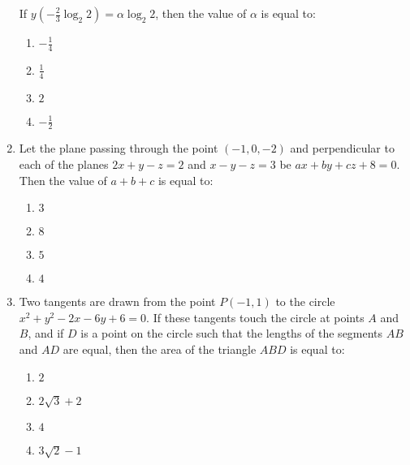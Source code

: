 \documentclass[journal]{IEEEtran}
\numberwithin{equation}{enumi}
\numberwithin{figure}{enumi}
\begin{document}
\begin{enumerate}
    If $ y\left(-\frac{2}{3} \log_2 2\right) = \alpha \log_2 2$, then the value of $ \alpha $ is equal to:
    \begin{enumerate}
        \item $ -\frac{1}{4} $
        \item $ \frac{1}{4} $
        \item $ 2 $
        \item $ -\frac{1}{2} $
    \end{enumerate}
    \item Let the plane passing through the point $(-1, 0, -2)$ and perpendicular to each of the planes $2x + y - z = 2$ and $x - y - z = 3$ be $ax + by + cz + 8 = 0$. Then the value of $ a + b + c $ is equal to:
    \begin{enumerate}
        \item $ 3 $
        \item $ 8 $
        \item $ 5 $
        \item $ 4 $
    \end{enumerate}

    \item Two tangents are drawn from the point $P(-1, 1)$ to the circle $x^2 + y^2 - 2x - 6y + 6 = 0$. If these tangents touch the circle at points $A$ and $B$, and if $D$ is a point on the circle such that the lengths of the segments $AB$ and $AD$ are equal, then the area of the triangle $ABD$ is equal to:
    \begin{enumerate}
        \item $ 2 $
        \item $ 2\sqrt{3} + 2 $
        \item $ 4 $
        \item $ 3\sqrt{2} - 1 $
    \end{enumerate}

  
\end{enumerate}
\end{document}
